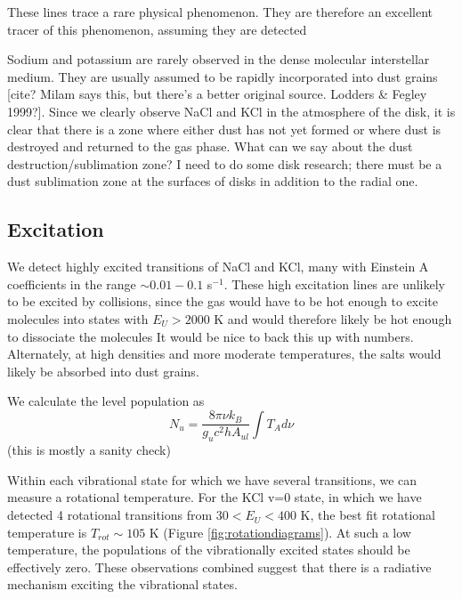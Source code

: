 \documentclass[twocolumn]{aastex62}
\begin{document}
These lines trace a rare physical phenomenon.  They are therefore an excellent tracer
of this phenomenon, assuming they are detected

Sodium and potassium are rarely observed in the dense molecular interstellar medium.
They are usually assumed to be rapidly incorporated into dust grains [cite?  Milam
says this, but there's a better original source.  Lodders \& Fegley 1999?].  Since we clearly observe NaCl
and KCl in the atmosphere of the disk, it is clear that there is a zone where either
dust has not yet formed or where dust is destroyed and returned to the gas phase.
{\color{red} What can we say about the dust destruction/sublimation zone?  I need
to do some disk research; there must be a dust sublimation zone at the surfaces
of disks in addition to the radial one.}

\subsection{Excitation}
We detect highly excited transitions of NaCl and KCl, many with Einstein A coefficients
in the range $\sim0.01-0.1$ s$^{-1}$.  These high excitation lines are unlikely
to be excited by collisions, since the gas would have to be hot enough to excite
molecules into states with $E_U > 2000$ K and would therefore likely be hot enough
to dissociate the molecules {\color{red} It would be nice to back this up with numbers}.  Alternately,
at high densities and more moderate temperatures, the salts would likely be absorbed
into dust grains.

We calculate the level population as
\begin{equation}
    N_u = \frac{8 \pi \nu k_B}{g_u c^2 h A_{ul}} \int T_A d\nu
\end{equation}
{\color{red} (this is mostly a sanity check)}

Within each vibrational state for which we have several transitions, we can
measure a rotational temperature.  For the KCl v=0 state, in which we have
detected 4 rotational transitions from $30 < E_U < 400$ K, the best fit
rotational temperature is $T_{rot}\sim105$ K (Figure
\ref{fig:rotationdiagrams}).  At such a low temperature, the populations of the
vibrationally excited states should be effectively zero.  These observations
combined suggest that there is a radiative mechanism exciting the vibrational
states.
\end{document}
